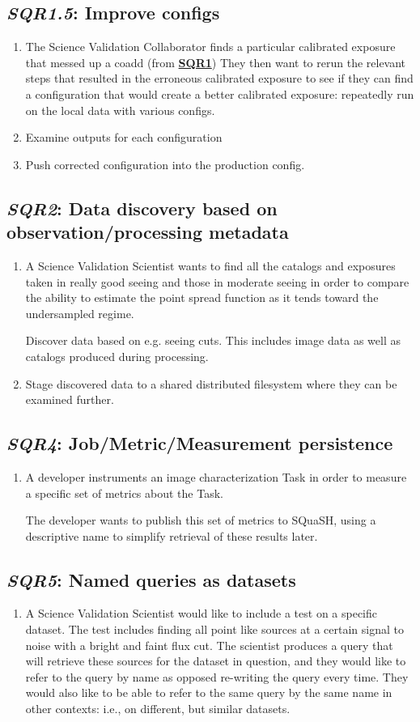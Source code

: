 \documentclass[DM,toc,lsstdraft]{lsstdoc}
\newcommand{\usecase}[3]{%
\subsection{\emph{#1}: #2}
\label{use:#1}
\begin{enumerate}[label=\alph*.]
#3
\end{enumerate}
}
\newcommand{\useref}[1]{\hyperref[use:#1]{\textcolor{lsstblue}{\textbf{#1}}}}
\begin{document}
\usecase{SQR1.5}{Improve configs}{%

\item

The Science Validation Collaborator finds a particular calibrated exposure that messed up a coadd (from \useref{SQR1})
They then want to rerun the relevant steps that resulted in the erroneous calibrated exposure to see if they can find a configuration that would create a better calibrated exposure: repeatedly run on the local data with various configs.

\item
Examine outputs for each configuration

\item
Push corrected configuration into the production config.

}

\usecase{SQR2}{Data discovery based on observation/processing metadata}{%

\item
A Science Validation Scientist wants to find all the catalogs and exposures taken in really good seeing and those in moderate seeing in order to compare the ability to estimate the point spread function as it tends toward the undersampled regime.

Discover data based on e.g. seeing cuts.
This includes image data as well as catalogs produced during processing.

\item
Stage discovered data to a shared distributed filesystem where they can be examined further.

}

\usecase{SQR4}{Job/Metric/Measurement persistence}{%

\item
A developer instruments an image characterization Task in order to measure a specific set of metrics about the Task.

The developer wants to publish this set of metrics to SQuaSH, using a descriptive name to simplify retrieval of these results later.

}

\usecase{SQR5}{Named queries as datasets}{%

\item
A Science Validation Scientist would like to include a test on a specific dataset.
The test includes finding all point like sources at a certain signal to noise with a bright and faint flux cut.
The scientist produces a query that will retrieve these sources for the dataset in question, and they would like to refer to the query by name as opposed re-writing the query every time.
They would also like to be able to refer to the same query by the same name in other contexts: i.e., on different, but similar datasets.

}
\end{document}
